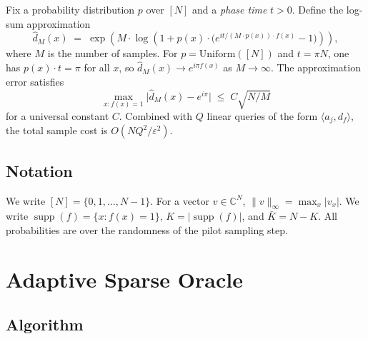 \documentclass[11pt]{article}
\DeclareMathOperator{\supp}{supp}
\newcommand{\eps}{\varepsilon}
\newcommand{\C}{\mathbb{C}}
\begin{document}
Fix a probability distribution $p$ over $[N]$ and a \emph{phase time} $t > 0$.  Define the log-sum approximation
\begin{equation}\label{eq:logsum}
  \hat{d}_M(x) \;=\; \exp\!\left(M \cdot \log\!\left(1 + p(x)\cdot \bigl(e^{it/(M\cdot p(x))\cdot f(x)} - 1\bigr)\right)\right),
\end{equation}
where $M$ is the number of samples.  For $p = \text{Uniform}([N])$ and $t = \pi N$, one has $p(x)\cdot t = \pi$ for all $x$, so $\hat{d}_M(x) \to e^{i\pi f(x)}$ as $M\to\infty$.  The approximation error satisfies
\begin{equation}\label{eq:zhao_bound}
  \max_{x: f(x)=1} \bigl|\hat{d}_M(x) - e^{i\pi}\bigr| \;\leq\; C\sqrt{N/M}
\end{equation}
for a universal constant $C$.  Combined with $Q$ linear queries of the form $\langle a_j, d_f\rangle$, the total sample cost is $O(NQ^2/\eps^2)$.

\subsection{Notation}

We write $[N] = \{0,1,\ldots,N-1\}$.  For a vector $v\in\C^N$, $\|v\|_\infty = \max_x |v_x|$.  We write $\supp(f) = \{x: f(x)=1\}$, $K = |\supp(f)|$, and $\bar{K} = N - K$.  All probabilities are over the randomness of the pilot sampling step.

\section{Adaptive Sparse Oracle}\label{sec:adaptive}

\subsection{Algorithm}
\end{document}
